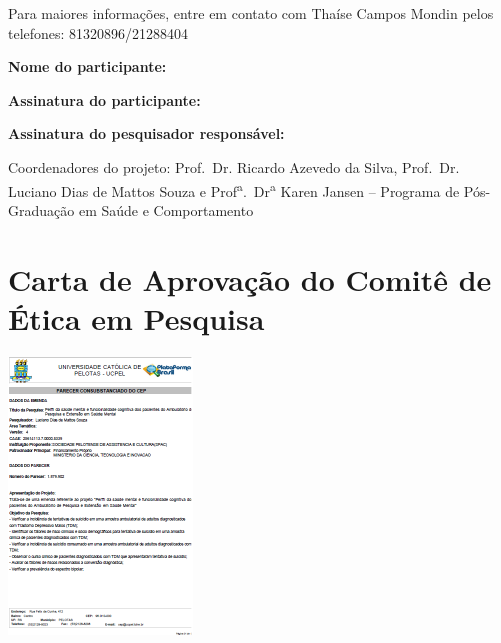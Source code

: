\documentclass[chapter=TITLE,
               oneside,
               12pt,
               a4paper,
               english,
               brazil]{abntex2}    %
\begin{document}
\begin{anexosenv}
{\begin{enumerate}
            \end{enumerate}

        Para maiores informações, entre em contato com Thaíse Campos Mondin pelos
        telefones: 81320896/21288404

        \textbf{Nome do participante:} \hrulefill

        \textbf{Assinatura do participante:} \hrulefill

        \textbf{Assinatura do pesquisador responsável:} \hrulefill

        Coordenadores do projeto: Prof.~Dr. Ricardo Azevedo da Silva, Prof.~Dr.
        Luciano Dias de Mattos Souza e Prof\textsuperscript{a}.~Dr\textsuperscript{a}
        Karen Jansen -- Programa de Pós-Graduação em Saúde e Comportamento

        }

    \chapter{Carta de Aprovação do Comitê de Ética em Pesquisa}
        
        \begin{center}
        \includegraphics[width=.95\textwidth]{img/cartacep01.pdf}
        \end{center}


\end{anexosenv}
\end{document}

